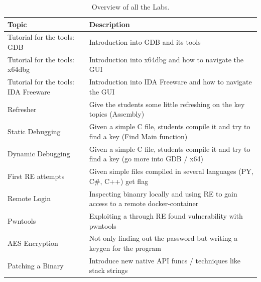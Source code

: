 \begin{center}
    \begin{table}[H]
        \centering
        \begin{tabular}{ |p{4.1cm}|p{10cm}| } 
            \hline
                Topic & 
                Description \\ [0.5ex] 
            \hline
            \hline
                Tutorial for the tools: GDB & Introduction into GDB and its tools \\
            \hline
                Tutorial for the tools: x64dbg & Introduction into x64dbg and how to navigate the GUI \\
            \hline
                Tutorial for the tools: IDA Freeware & Introduction into IDA Freeware and how to navigate the GUI \\
            \hline
                Refresher & 
                Give the students some little refreshing on the key topics (Assembly)  \\ 
            \hline
                Static Debugging & 
                Given a simple C file, students compile it and try to find a key (Find Main function) \\ 
            \hline
                Dynamic Debugging & 
                Given a simple C file, students compile it and try to find a key (go more into GDB / x64) \\ 
            \hline
                First RE attempts & 
                Given simple files compiled in several languages (PY, C\#, C++) get flag \\ 
            \hline
                Remote Login  & 
                Inspecting binanry locally and using RE to gain access to a remote docker-container \\
            \hline
                Pwntools & 
                Exploiting a through RE found vulnerability with pwntools \\
            \hline
                AES Encryption & 
                Not only finding out the password but writing a keygen for the program \\
            \hline
                Patching a Binary & 
                Introduce new native API funcs / techniques like stack strings \\
            \hline
        \end{tabular}
        \caption{Overview of all the Labs.}
        \label{tab:labs}
    \end{table}
\end{center}
